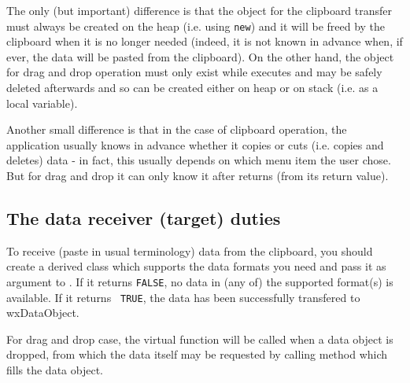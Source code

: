 The only (but important) difference is that the object for the clipboard
transfer must always be created on the heap (i.e. using {\tt new}) and it will
be freed by the clipboard when it is no longer needed (indeed, it is not known
in advance when, if ever, the data will be pasted from the clipboard). On the
other hand, the object for drag and drop operation must only exist while 
 executes and may be safely deleted
afterwards and so can be created either on heap or on stack (i.e. as a local
variable).

Another small difference is that in the case of clipboard operation, the
application usually knows in advance whether it copies or cuts (i.e. copies and
deletes) data - in fact, this usually depends on which menu item the user
chose. But for drag and drop it can only know it after 
 returns (from its return value).

\subsection{The data receiver (target) duties}\label{wxdataobjecttarget}

To receive (paste in usual terminology) data from the clipboard, you should
create a  derived class which supports the
data formats you need and pass it as argument to 
. If it returns {\tt FALSE},
no data in (any of) the supported format(s) is available. If it returns {\tt
TRUE}, the data has been successfully transfered to wxDataObject.

For drag and drop case, the  
virtual function will be called when a data object is dropped, from which the
data itself may be requested by calling 
 method which fills
the data object.

